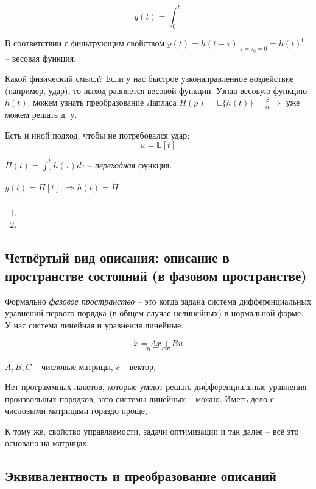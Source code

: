 \documentclass[main.tex]{subfiles}
\begin{document}
$$ y(t) = \int_0^t  $$

В соответствии с фильтрующим свойством $ y(t) = h(t-\tau)|_{\tau=\tau_0=0}=h(t)^0 $ -- весовая функция.

Какой физический смысл?
Если у нас быстрое узконаправленное воздействие (например, удар), то выход равняется весовой функции.
Узнав весовую функцию $ h(t) $, можем узнать преобразование Лапласа $ H(p) = \mathds{L}\{h(t)\} = \frac{\beta}{\alpha} \Rightarrow $ уже можем решать д. у.

Есть и иной подход, чтобы не потребовался удар:
$$ u = \mathds{L}[t]  $$ %

$\Pi(t) = \int_0^t h(\tau)d\tau$ -- \emph{переходная} функция.

$ y(t) = \Pi[t],  \Rightarrow h(t) = \dot \Pi $

\subsubsection{}

\begin{enumerate}[noitemsep]
	\item
	\item
\end{enumerate}

\subsection{Четвёртый вид описания: описание в пространстве состояний (в фазовом пространстве)}

Формально \emph{фазовое пространство} -- это когда задана система дифференциальных уравнений первого порядка (в общем случае нелинейных) в нормальной форме.
У нас система линейная и уравнения линейные.

$$ \dot x = Ax + Bu $$
$$ y = cx $$

$ A, B, C $ -- числовые матрицы, $ c $ -- вектор,

Нет программных пакетов, которые умеют решать дифференциальные уравнения произвольных порядков, зато системы линейных -- можно.
Иметь дело с числовыми матрицами гораздо проще,

К тому же, свойство управляемости, задачи оптимизации и так далее -- всё это основано на матрицах.

\subsection{Эквивалентность и преобразование описаний}
\end{document}
